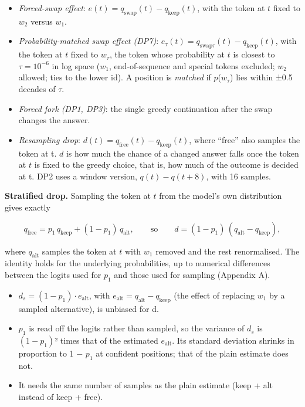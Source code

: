 \documentclass[
  10pt,
  a4paper,
]{article}
\providecommand{\tightlist}{%
  \setlength{\itemsep}{0pt}\setlength{\parskip}{0pt}}
\begin{document}
\begin{itemize}
\tightlist
\item
  \emph{Forced-swap effect}: \(e(t) = q_{\mathrm{swap}}(t) - q_{\mathrm{keep}}(t)\), with the token at \(t\) fixed to \(w_2\) versus \(w_1\).
\item
  \emph{Probability-matched swap effect (DP7)}: \(e_\tau(t) = q_{\mathrm{swap}\tau}(t) - q_{\mathrm{keep}}(t)\), with the token at \(t\) fixed to \(w_{\tau}\), the token whose probability at \(t\) is
  closest to \(\tau = 10^{-6}\) in log space (\(w_1\), end-of-sequence and special tokens excluded; \(w_2\) allowed; ties to the lower id). A position is \emph{matched} if \(p\)(\(w_{\tau}\)) lies
  within ±0.5 decades of \(\tau\).
\item
  \emph{Forced fork (DP1, DP3)}: the single greedy continuation after the swap changes the answer.
\item
  \emph{Resampling drop}: \(d(t) = q_{\mathrm{free}}(t) - q_{\mathrm{keep}}(t)\), where ``free'' also samples the token at t. \(d\) is how much the chance of a changed answer falls once the token at
  \(t\) is fixed to the greedy choice, that is, how much of the outcome is decided at t. DP2 uses a window version, \(q(t) - q(t+8)\), with 16 samples.
\end{itemize}

\textbf{Stratified drop.} Sampling the token at \(t\) from the model's own distribution gives exactly

\[q_{\mathrm{free}} = p_1\,q_{\mathrm{keep}} + (1-p_1)\,q_{\mathrm{alt}},\qquad\text{so}\qquad d = (1-p_1)\,(q_{\mathrm{alt}}-q_{\mathrm{keep}}),\]

where \(q_{\mathrm{alt}}\) samples the token at \(t\) with \(w_1\) removed and the rest renormalised. The identity holds for the underlying probabilities, up to numerical differences between the
logits used for \(p_1\) and those used for sampling (Appendix A).

\begin{itemize}
\tightlist
\item
  \(d_{s} = (1-p_1) \cdot e_{\mathrm{alt}}\), with \(e_{\mathrm{alt}} = q_{\mathrm{alt}} - q_{\mathrm{keep}}\) (the effect of replacing \(w_1\) by a sampled alternative), is unbiased for d.
\item
  \(p_1\) is read off the logits rather than sampled, so the variance of \(d_{s}\) is \((1-p_1)\)² times that of the estimated \(e_{\mathrm{alt}}\). Its standard deviation shrinks in proportion to 1 −
  \(p_1\) at confident positions; that of the plain estimate does not.
\item
  It needs the same number of samples as the plain estimate (keep + alt instead of keep + free).
\end{itemize}
\end{document}
